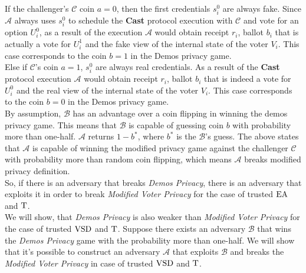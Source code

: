  If the challenger's  $\mathcal{C}$ coin $a=0$, then the first credentials $s^0_i$ are always fake. Since $\mathcal{A}$ always uses $s^0_i$ to schedule the \textbf{Cast} protocol execution with $\mathcal{C}$ and vote for an option $U^0_i$, as a result of the execution $\mathcal{A}$ would obtain receipt $r_i$, ballot $b_i$ that is actually a vote for $U^1_i$  and the fake view of the internal state of the voter $V_i$. This case corresponds to the coin $b=1$ in the Demos privacy game. \\
 
 Else if $\mathcal{C}$'s coin $a=1$, $s^0_i$ are always real credentials. As a result of the \textbf{Cast}  protocol execution $\mathcal{A}$ would obtain receipt $r_i$, ballot $b_i$ that is indeed a vote for $U^0_i$  and the real view of the internal state of the voter $V_i$. This case corresponds to the coin $b=0$ in the Demos privacy game.\\
 
By assumption, $\mathcal{B}$ has an advantage over a coin flipping in winning the demos privacy game. This means that  $\mathcal{B}$ is capable of guessing coin $b$ with probability more than one-half.  $\mathcal{A}$ returns $1-b^*$, where $b^*$ is the $\mathcal{B}$'s guess. The above states that $\mathcal{A}$ is capable of winning the modified privacy game against  the challenger $\mathcal{C}$ with probability more than random coin flipping, which means $\mathcal{A}$ breaks modified privacy definition. \\

So, if there is an adversary that breaks \textit{Demos Privacy}, there is an adversary that exploits it in order to  break \textit{Modified Voter Privacy} for the case of trusted $\operatorname{EA}$ and $\operatorname{T}$. \\

We will show, that \textit{Demos Privacy} is also weaker than  \textit{Modified Voter Privacy} for the case of trusted $\operatorname{VSD}$ and $\operatorname{T}$. Suppose there exists an adversary $\mathcal{B}$ that wins the \textit{Demos Privacy} game with the probability more than one-half. We will show that it's possible to construct an adversary $\mathcal{A}$ that exploits $\mathcal{B}$ and breaks the \textit{Modified Voter Privacy} in case of trusted $\operatorname{VSD}$ and $\operatorname{T}$.\\

